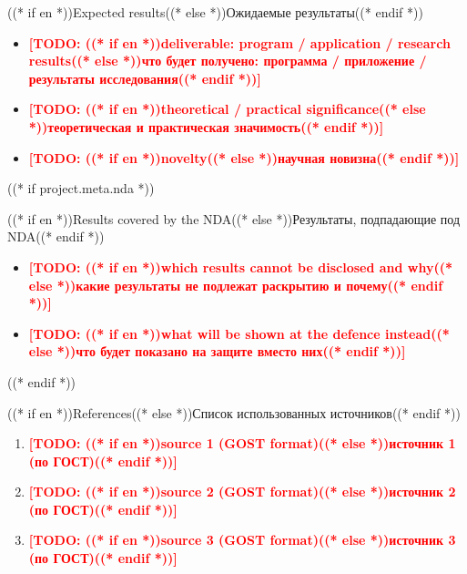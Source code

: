 \documentclass[aspectratio=169, 14pt]{beamer}
\newcommand{\todo}[1]{\textcolor{red}{\textbf{[TODO: #1]}}}
\begin{document}
\begin{frame}{((* if en *))Expected results((* else *))Ожидаемые результаты((* endif *))}
  \begin{itemize}
    \item \todo{((* if en *))deliverable: program / application / research results((* else *))что будет получено: программа / приложение / результаты исследования((* endif *))}
    \item \todo{((* if en *))theoretical / practical significance((* else *))теоретическая и практическая значимость((* endif *))}
    \item \todo{((* if en *))novelty((* else *))научная новизна((* endif *))}
  \end{itemize}
\end{frame}

((* if project.meta.nda *))
\begin{frame}{((* if en *))Results covered by the NDA((* else *))Результаты, подпадающие под NDA((* endif *))}
  \begin{itemize}
    \item \todo{((* if en *))which results cannot be disclosed and why((* else *))какие результаты не подлежат раскрытию и почему((* endif *))}
    \item \todo{((* if en *))what will be shown at the defence instead((* else *))что будет показано на защите вместо них((* endif *))}
  \end{itemize}
\end{frame}
((* endif *))

\begin{frame}{((* if en *))References((* else *))Список использованных источников((* endif *))}
  \footnotesize
  \begin{enumerate}
    \item \todo{((* if en *))source 1 (GOST format)((* else *))источник 1 (по ГОСТ)((* endif *))}
    \item \todo{((* if en *))source 2 (GOST format)((* else *))источник 2 (по ГОСТ)((* endif *))}
    \item \todo{((* if en *))source 3 (GOST format)((* else *))источник 3 (по ГОСТ)((* endif *))}
  \end{enumerate}
\end{frame}
\end{document}
